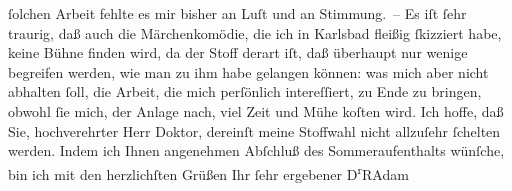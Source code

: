 \begin{ledgroupsized}[t]{13cm}
               ſolchen Arbeit fehlte es mir bisher an Luſt und an Stimmung. –\pend
           \pstart
           Es iſt ſehr traurig, daß auch die Märchenkomödie, die ich in Karlsbad fleißig
               ſkizziert habe, keine Bühne finden wird, da der Stoff derart iſt, daß überhaupt nur
               wenige begreifen werden, wie man zu ihm habe gelangen können: was mich aber nicht
               abhalten ſoll, die Arbeit, die mich perſönlich intereſſiert, {\pb}zu Ende zu bringen, obwohl ſie mich, der
               Anlage nach, viel Zeit und Mühe koſten wird. Ich hoffe, daß Sie, hochverehrter Herr
               Doktor, dereinſt meine Stoffwahl nicht allzuſehr ſchelten werden.\pend
           \pstart
           Indem ich Ihnen angenehmen Abſchluß des Sommeraufenthalts wünſche, bin ich mit den
               herzlichſten Grüßen Ihr ſehr ergebener\pend
           \pstart \spacefill\mbox{D\textsuperscript{r}RAdam}\pend{}
         
         \endnumbering{}\end{ledgroupsized}  \newcommand{\dateiname}{L02325}\newcommand{\titel}{Robert Adam an Arthur Schnitzler, 19. 8. 1919}\newcommand{\editorInnen}{Martin Anton Müller und Gerd-Hermann Susen}
      